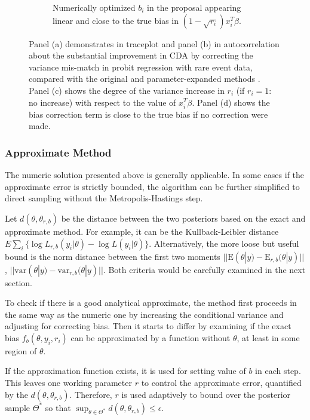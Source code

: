 \documentclass[10pt]{article}
\newcommand{\xbeta}{ x_i^T \beta}
\begin{document}
\begin{figure}[H]
\begin{subfigure}[b]{0.49\textwidth}
  \caption{Numerically optimized $b_i$ in the proposal appearing linear and close to the true bias in $(1-\sqrt{r_i} ) \xbeta$.}
\end{subfigure}
\label{probit_demo}
 \caption{Panel (a) demonstrates in traceplot and panel (b) in autocorrelation about the substantial improvement in CDA by correcting the variance mis-match in probit regression with rare event data, compared with the original \citep{albert1993bayesian} and parameter-expanded methods \citep{liu1999parameter}. Panel (c) shows the degree of the variance increase in $r_i$ (if $r_i=1$: no increase) with respect to the value of $\xbeta$. Panel (d) shows the bias correction term is close to the true bias if no correction were made. }
 \end{figure}
 
\subsubsection{Approximate Method}

The numeric solution presented above is generally applicable. In some cases  if the approximate error is strictly bounded, the algorithm can be further simplified to direct sampling without the Metropolis-Hastings step.

Let $d(\theta, \theta_{r,b})$ be the distance between the two posteriors based on the exact and approximate method. For example, it can be the Kullback-Leibler distance $E\sum_i \{ \log L_{r,b}(y_i | \theta) - \log L(y_i| \theta)\}$. Alternatively, the more loose but useful bound is the norm distance between the first two moments $||\mbox{E}(\theta|y)-\mbox{E}_{r,b}(\theta|y)||$,  $||\mbox{var}(\theta|y)-\mbox{var}_{r,b}(\theta|y)||$. Both criteria would be carefully examined in the next section.

To check if there is a good analytical approximate, the method first proceeds in the same way as the numeric one by increasing the conditional variance and adjusting for correcting bias. Then it starts to differ by examining if the exact bias $f_b(\theta,y_i,r_i)$ can be approximated by a function without $\theta$, at least in some region of $\theta$.

If the approximation function exists, it is used for setting value of $b$ in each step. This leaves one working parameter $r$ to control the approximate error, quantified by the $d(\theta, \theta_{r,b})$. Therefore,  $r$ is used adaptively to bound over the posterior sample $\varTheta^*$ so that $\sup_{\theta \in \varTheta^*} d(\theta, \theta_{r,b})\le \epsilon$.
\end{document}
